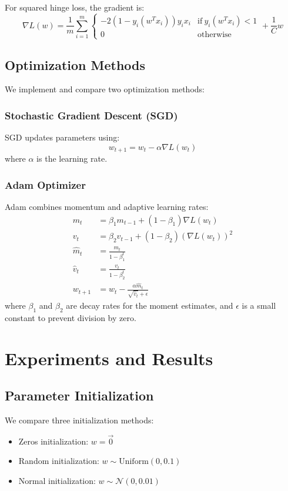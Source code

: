\documentclass[journal, a4paper]{IEEEtran}
\begin{document}
For squared hinge loss, the gradient is:
\begin{equation}
\nabla L(w) = \frac{1}{m}\sum_{i=1}^{m} \begin{cases} 
-2(1-y_i(w^T x_i))y_i x_i & \text{if}\ y_i(w^T x_i) < 1 \\
0 & \text{otherwise}
\end{cases} + \frac{1}{C}w
\end{equation}

\subsection{Optimization Methods}
We implement and compare two optimization methods:

\subsubsection{Stochastic Gradient Descent (SGD)}
SGD updates parameters using:
\begin{equation}
w_{t+1} = w_t - \alpha \nabla L(w_t)
\end{equation}
where $\alpha$ is the learning rate.

\subsubsection{Adam Optimizer}
Adam combines momentum and adaptive learning rates:
\begin{align}
m_t &= \beta_1 m_{t-1} + (1-\beta_1) \nabla L(w_t) \\
v_t &= \beta_2 v_{t-1} + (1-\beta_2) (\nabla L(w_t))^2 \\
\hat{m}_t &= \frac{m_t}{1-\beta_1^t} \\
\hat{v}_t &= \frac{v_t}{1-\beta_2^t} \\
w_{t+1} &= w_t - \frac{\alpha \hat{m}_t}{\sqrt{\hat{v}_t} + \epsilon}
\end{align}
where $\beta_1$ and $\beta_2$ are decay rates for the moment estimates, and $\epsilon$ is a small constant to prevent division by zero.

\section{Experiments and Results}

\subsection{Parameter Initialization}
We compare three initialization methods:
\begin{itemize}
    \item Zeros initialization: $w = \vec{0}$
    \item Random initialization: $w \sim \text{Uniform}(0, 0.1)$
    \item Normal initialization: $w \sim \mathcal{N}(0, 0.01)$
\end{itemize}
\end{document}
